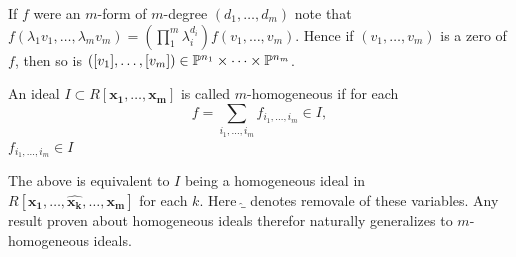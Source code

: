     \begin{remark}
        If $f$ were an $m$-form of $m$-degree $(d_1,\dots,d_m)$ note that $f(\lambda_1v_1,\dots,\lambda_mv_m)=\left(\prod_1^m \lambda_i^{d_i}\right)f(v_1,\dots,v_m)$. Hence if $(v_1,\dots,v_m)$ is a zero of $f$, then so is $([v_1],\dots,[v_m])\in \mathbb{P}^{n_1}\times\cdots \times \mathbb{P}^{n_m}$.
    \end{remark}
    \begin{definition}
        An ideal $I\subset R[\mathbf{x_1},\dots,\mathbf{x_m}]$ is called $m$-homogeneous if for each $$f=\sum_{i_1,\dots,i_m} f_{i_1,\dots,i_m}\in I,$$ $f_{i_1,\dots,i_m}\in I$
    \end{definition}
    \begin{remark}\label{ImporatantRemarkForMultiprojectiveSpace}
        The above is equivalent to $I$ being a homogeneous ideal in \\$R[\mathbf{x_1},\dots, \widehat{\mathbf{x_k}},\dots,\mathbf{x_m}]$ for each $k$. Here $\widehat{\_}$ denotes removale of these variables. Any result proven about homogeneous ideals therefor naturally generalizes to $m$-homogeneous ideals. 
    \end{remark}
